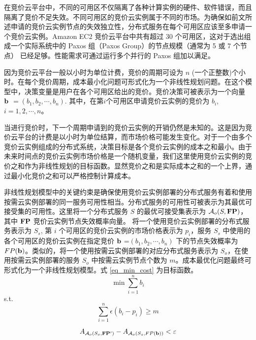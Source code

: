在竞价云平台中，不同的可用区不仅隔离了各种计算实例的硬件、软件错误，而且隔离了竞价不足失效。不同可用区的竞价云实例属于不同的市场。为确保如前文所述申请的竞价云实例节点的失效独立性，分布式服务在每个可用区应该至多申请一个竞价云实例。Amazon EC2 竞价云平台中共有超过 30 个可用区，这对于选出组成一个实际系统中的 Paxos 组（Paxos Group）的节点规模（通常为 5 或 7 个节点）\cite{Burrows:2006:CLS:1298455.1298487} 已经足够。性能需求可通过运行多个并行的 Paxos 组加以满足。

因为竞价云平台一般以小时为单位计费，竞价的周期可设为 $n$ (一个正整数)个小时。在每个竞价周期，成本最小化问题可形式化为一个非线性规划问题。在这个模型中，决策变量是用户在各个可用区给出的竞价。竞价决策可被表示为一个向量 $\bf b$ $= (b_1, b_2, \cdots, b_n)$. 其中，在第$i$个可用区申请竞价云实例的竞价为 $b_i$, $i = 1, 2, \cdots, n$。

当进行竞价时，下一个周期申请到的竞价云实例的开销仍然是未知的。这是因为竞价云平台的计费是以小时为单位结算，而市场价格可能发生变化。对于一个由多个竞价云实例组成的分布式系统，决策目标是各个竞价云实例的成本之和最小。由于未来时间点的竞价云实例市场价格是一个随机变量，我们这里使用竞价云实例的竞价之和作为非线性规划的目标函数。显然竞价之和是实际成本之和的一个上界，通过最小化竞价之和可以严格控制计算成本。

非线性规划模型中的关键约束是确保使用竞价云实例部署的分布式服务有着和使用按需云实例部署的同一服务可用性相当。分布式服务的可用性可被表示为其最优可接受集的可用性。这里将一个分布式服务 $S$ 的最优可接受集表示为 $\mathcal{A}_{o}(S, \bf{FP})$，其中 $\bf{FP}$ 竞价云实例节点失效概率向量。 将一个使用竞价云实例部署的分布式服务表示为 $S_s$, 第 $i$ 个可用区的竞价云实例的市场价格表示为 $p_i$，服务 $S_s$ 中使用的各个可用区的竞价云实例在指定竞价 $\bf b$ =$ (b_1, b_2, \cdots, b_n)$ 下的节点失效概率为 $FP(\bf b)$。类似的，将一个使用按需云实例部署的对应分布式服务表示为 $S_o$，在使用按需云实例部署的服务 $S_o$ 中按需云实例节点个数为 $m$。成本最优化问题最终可形式化为一个非线性规划模型。式 \eqref{eq_min_cost} 为目标函数。
\begin{equation}\label{eq_min_cost}
\min \sum_{i=1}^n b_i
\end{equation}
s.t.
\begin{equation}\label{eq_bgp}
\sum_{i=1}^n {\epsilon(b_i - p_i)} \geq m
\end{equation}

\begin{equation}\label{eq_aae}
A_{\mathcal{A}_{o}(S_o, {\bf{FP^{\prime}}})} - A_{\mathcal{A}_{o}(S_s, FP(\bf b))} < \varepsilon
\end{equation}

